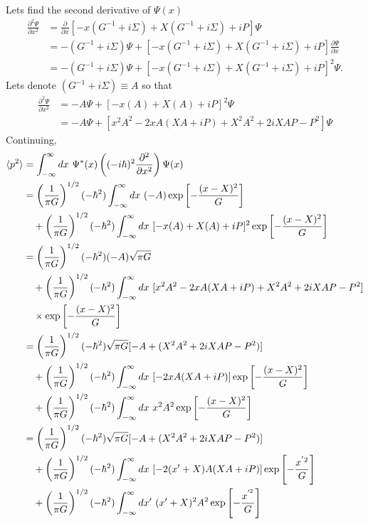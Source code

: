 \documentclass[11pt,letterpaper]{article}
\begin{document}
\begin{enumerate}
\begin{enumerate}
Lets find the second derivative of $\Psi(x)$
\begin{align*}\frac{\partial^2\Psi}{\partial x^2} &= \frac{\partial}{\partial x}[-x(G^{-1}+i\Sigma)+X(G^{-1}+i\Sigma)+iP]\Psi \\
&= -(G^{-1}+i\Sigma)\Psi+[-x(G^{-1}+i\Sigma)+X(G^{-1}+i\Sigma)+iP]\frac{\partial\Psi}{\partial x}\\
&=-(G^{-1}+i\Sigma)\Psi+[-x(G^{-1}+i\Sigma)+X(G^{-1}+i\Sigma)+iP]^2\Psi.
\end{align*}
Lets denote $(G^{-1}+i\Sigma)\equiv A$ so that
\begin{align*}\frac{\partial^2\Psi}{\partial x^2} &= -A\Psi+[-x(A)+X(A)+iP]^2\Psi\\
&=-A\Psi+[x^2A^2-2xA(XA+iP)+X^2A^2+2iXAP-P^2]\Psi
\end{align*}
Continuing,
\begin{align*}\braket{p^2} &= \int_{-\infty}^{\infty}{dx\ \Psi^*(x)\left((-i\hbar)^2\frac{\partial^2}{\partial x^2}\right)\Psi(x)}\\
&=\left(\frac{1}{\pi G}\right)^{1/2}(-\hbar^2)\int_{-\infty}^{\infty}{dx\ (-A)\exp{\left[-\frac{(x-X)^2}{G}\right]}}\\
&\quad+\left(\frac{1}{\pi G}\right)^{1/2}(-\hbar^2)\int_{-\infty}^{\infty}{dx\ [-x(A)+X(A)+iP]^2\exp{\left[-\frac{(x-X)^2}{G}\right]}}\\
&=\left(\frac{1}{\pi G}\right)^{1/2}(-\hbar^2)(-A)\sqrt{\pi G}\\
&\quad+\left(\frac{1}{\pi G}\right)^{1/2}(-\hbar^2)\int_{-\infty}^{\infty}{dx\ [x^2A^2-2xA(XA+iP)+X^2A^2+2iXAP-P^2]}\\
&\quad\times\exp{\left[-\frac{(x-X)^2}{G}\right]}\\
&=\left(\frac{1}{\pi G}\right)^{1/2}(-\hbar^2)\sqrt{\pi G}[-A+(X^2A^2+2iXAP-P^2)]\\
&\quad+\left(\frac{1}{\pi G}\right)^{1/2}(-\hbar^2)\int_{-\infty}^{\infty}{dx\ [-2xA(XA+iP)]\exp{\left[-\frac{(x-X)^2}{G}\right]}}\\
&\quad+\left(\frac{1}{\pi G}\right)^{1/2}(-\hbar^2)\int_{-\infty}^{\infty}{dx\ x^2A^2\exp{\left[-\frac{(x-X)^2}{G}\right]}}\\
&=\left(\frac{1}{\pi G}\right)^{1/2}(-\hbar^2)\sqrt{\pi G}[-A+(X^2A^2+2iXAP-P^2)]\\
&\quad+\left(\frac{1}{\pi G}\right)^{1/2}(-\hbar^2)\int_{-\infty}^{\infty}{dx\ [-2(x'+X)A(XA+iP)]\exp{\left[-\frac{x^{'2}}{G}\right]}}\\
&\quad+\left(\frac{1}{\pi G}\right)^{1/2}(-\hbar^2)\int_{-\infty}^{\infty}{dx'\ (x'+X)^2A^2\exp{\left[-\frac{x^{'^2}}{G}\right]}}\\

\end{align*}
\end{enumerate}
\end{enumerate}
\end{document}
